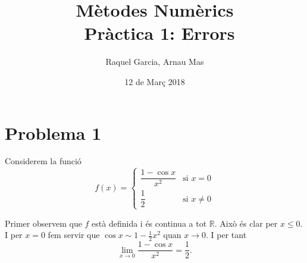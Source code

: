 \documentclass[12pt]{article}
\title{\textsf{\textbf{Mètodes Numèrics \\ Pràctica 1:} Errors}}
\author{\textsf{Raquel Garcia, Arnau Mas}}
\date{\textsf{12 de Març 2018}}
\newcommand{\R}{\mathbb{R}}
\begin{document}
\maketitle

\section*{Problema 1}
Considerem la funció
\begin{equation*}
	f(x) = 
	\begin{cases}
		\dfrac{1 - \cos{x}}{x^2} & \text{si } x = 0 \\
		\dfrac{1}{2} & \text{si } x \neq 0
	\end{cases}
\end{equation*}

Primer observem que \( f \) està definida i és continua a tot \( \R \). Això és clar per \( x \leq 0 \). I per \( x = 0 \) fem servir que \( \cos{x} \sim 1 - \frac{1}{2} x^2 \) quan \( x \to 0 \). I per tant 
\begin{equation*}
	\lim_{x \to 0}{\dfrac{1 - \cos{x}}{x^2}} = \dfrac{1}{2}.
\end{equation*}
\end{document}
